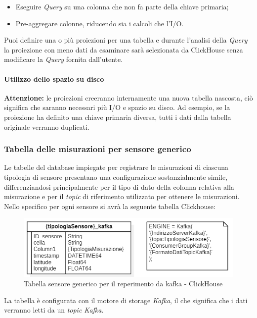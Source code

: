 \begin{itemize}
    \item Eseguire \textit{Query} su una colonna che non fa parte della chiave primaria;
    \item Pre-aggregare colonne, riducendo sia i calcoli che l'I/O.
\end{itemize}

Puoi definire una o più proiezioni per una tabella e durante l'analisi della \textit{Query} la proiezione con meno dati da esaminare sarà selezionata da ClickHouse senza modificare la \textit{Query} fornita dall'utente.

\paragraph*{Utilizzo dello spazio su disco}
\textbf{Attenzione:} le proiezioni creeranno internamente una nuova tabella nascosta, ciò significa che saranno necessari più I/O e spazio su disco. Ad esempio, se la proiezione ha definito una chiave primaria diversa, tutti i dati dalla tabella originale verranno duplicati.

\subsubsection{Tabella delle misurazioni per sensore generico}
Le tabelle del database impiegate per registrare le misurazioni di ciascuna tipologia di sensore presentano una configurazione sostanzialmente simile, differenziandosi principalmente per il tipo di dato della colonna relativa alla misurazione e per il \textit{topic} di riferimento utilizzato per ottenere le misurazioni.
Nello specifico per ogni sensore si avrà la seguente tabella Clickhouse:
\begin{figure}[H]
    \centering
    \includegraphics[width=.6\textwidth]{../Images/SpecificaTecnica/sensorType_kafka.PNG}
    \caption{Tabella sensore generico per il reperimento da kafka - ClickHouse}
    \label{fig:sensorKafka}
  \end{figure}

    La tabella è configurata con il motore di storage \textit{Kafka}, il che significa che i dati verranno letti da un \textit{topic Kafka}. 

